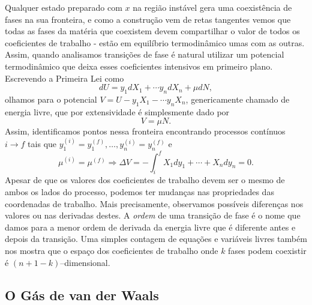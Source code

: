 Qualquer estado preparado com $x$ na região instável gera uma coexistência de
fases na sua fronteira, e como a construção vem de retas tangentes vemos que
todas as fases da matéria que coexistem devem compartilhar o valor de todos os
coeficientes de trabalho - estão em equilíbrio termodinâmico umas com as outras.
Assim, quando analisamos transições de fase é natural utilizar um potencial
termodinâmico que deixa esses coeficientes intensivos em primeiro plano. 
Escrevendo a Primeira Lei como
$$dU=y_1dX_1+\cdots y_ndX_n+\mu dN,$$
olhamos para o potencial $V=U-y_1X_1-\cdots y_nX_n$, genericamente chamado de
energia livre, que por extensividade é simplesmente dado por
$$V=\mu N.$$
Assim, identificamos pontos nessa fronteira encontrando processos contínuos $i
\rightarrow f$ tais que $y_1^{(i)}=y_1^{(f)},\dots,y_n^{(i)}=y_n^{(f)}$ e
$$\mu^{(i)}=\mu^{(f)}\Rightarrow\Delta V=-\int_i^fX_1dy_1+\cdots+X_ndy_n=0.$$
Apesar de que os valores dos coeficientes de trabalho devem ser o mesmo de ambos
os lados do processo, podemos ter mudanças nas propriedades das coordenadas de
trabalho. Mais precisamente, observamos possíveis diferenças nos valores ou nas
derivadas destes. A \emph{ordem} de uma transição de fase é o nome que damos
para a menor ordem de derivada da energia livre que é diferente antes e depois
da transição. Uma simples contagem de equações e variáveis livres também nos
mostra que o espaço dos coeficientes de trabalho onde $k$ fases podem coexistir
é $(n+1-k)$--dimensional.

\subsection{O Gás de van der Waals}

